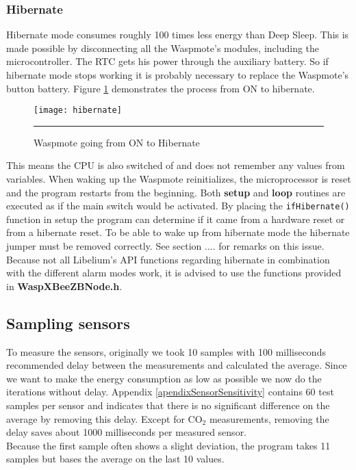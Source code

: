 \subsubsection{Hibernate}
Hibernate mode consumes roughly 100 times less energy than Deep Sleep. This is made possible by disconnecting all the Waspmote's modules, including the microcontroller. The RTC gets his power through the auxiliary battery. So if hibernate mode stops working it is probably necessary to replace the Waspmote's button battery. Figure \ref{fig:hibernate} demonstrates the process from ON to hibernate.\\
\begin{figure}[ht]
\centering
\texttt{[image: hibernate]}
\rule{30em}{0.5pt}
\caption{Waspmote going from ON to Hibernate}
\label{fig:hibernate}
\end{figure}
This means the CPU is also switched of and does not remember any values from variables. When waking up the Waspmote reinitializes, the microprocessor is reset and the program restarts from the beginning. Both \textbf{setup} and \textbf{loop} routines are executed as if the main switch would be activated. By placing the \verb+ifHibernate()+ function in setup the program can determine if it came from a hardware reset or from a hibernate reset. To be able to wake up from hibernate mode the hibernate jumper must be removed correctly. See section .... for remarks on this issue. \\Because not all Libelium's API functions regarding hibernate in combination with the different alarm modes work, it is advised to use the functions provided in \textbf{WaspXBeeZBNode.h}. 
\subsection{Sampling sensors}
To measure the sensors, originally we took 10 samples with 100 milliseconds recommended delay between the measurements and calculated the average. Since we want to make the energy consumption as low as possible we now do the iterations without delay. Appendix \ref{apendixSensorSensitivity} contains 60 test samples per sensor and indicates that there is no significant difference on the average by removing this delay. Except for CO$_{2}$ measurements, removing the delay saves about 1000 milliseconds per measured sensor.\\ 
Because the first sample often shows a slight deviation, the program takes 11 samples but bases the average on the last 10 values.
